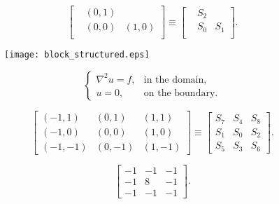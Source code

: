 \documentclass[11pt]{book}
\begin{document}
{\newpage
\clearpage
\samepage \begin{equation}\label{eqn-symmetric-stencil}
\left [
\begin{array}{ccc}
 & ( 0, 1) &         \\ 
 & ( 0, 0) & ( 1, 0) \\ 
 &         &        
\end{array}
\right ]
\equiv
\left [
\begin{array}{ccc}
 & S_2 &     \\ 
 & S_0 & S_1 \\ 
 &     &    
\end{array}
\right ] .
\end{equation}
}

{\newpage
\clearpage
\samepage \begin{figure}[t]
\centering
\texttt{[image: block\_structured.eps]}

\label{fig-block-structured-grid}
\end{figure}
}

{\newpage
\clearpage
\samepage \begin{equation}\label{sstruct:eqn-laplacian}
\left \{
\begin{array}{ll}
\nabla^2 u = f , & \mbox{in the domain}, \\ 
u = 0,           & \mbox{on the boundary}.
\end{array}
\right .
\end{equation}
}

{\newpage
\clearpage
\samepage \begin{equation}\label{sstruct:eqn-stencil-description}
\left [
\begin{array}{ccc}
(-1, 1) & ( 0, 1) & ( 1, 1) \\ 
(-1, 0) & ( 0, 0) & ( 1, 0) \\ 
(-1,-1) & ( 0,-1) & ( 1,-1) 
\end{array}
\right ]
\equiv
\left [
\begin{array}{ccc}
S_7 & S_4 & S_8 \\ 
S_1 & S_0 & S_2 \\ 
S_5 & S_3 & S_6
\end{array}
\right ] .
\end{equation}
}

{\newpage
\clearpage
\samepage \begin{equation}\label{sstruct:eqn-stencil-laplacian}
\left [
\begin{array}{ccc}
 -1 & -1 & -1 \\ 
 -1 &  8 & -1 \\ 
 -1 & -1 & -1 
\end{array}
\right ] .
\end{equation}
}
\end{document}
